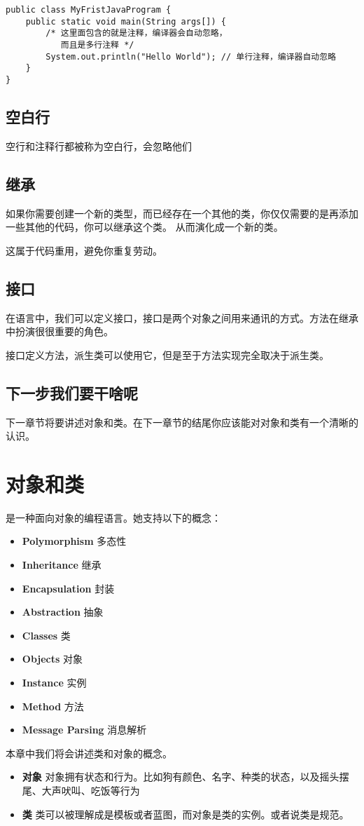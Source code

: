 \documentclass{article}
\begin{document}
\begin{verbatim}
public class MyFristJavaProgram {
	public static void main(String args[]) {
		/* 这里面包含的就是注释，编译器会自动忽略，
		   而且是多行注释 */
		System.out.println("Hello World"); // 单行注释，编译器自动忽略
	}
}
\end{verbatim}

\subsection{空白行}
空行和注释行都被称为空白行，会忽略他们

\subsection{继承}
如果你需要创建一个新的类型，而已经存在一个其他的类，你仅仅需要的是再添加一些其他的代码，你可以继承这个类。
从而演化成一个新的类。

这属于代码重用，避免你重复劳动。

\subsection{接口}
在语言中，我们可以定义接口，接口是两个对象之间用来通讯的方式。方法在继承中扮演很很重要的角色。

接口定义方法，派生类可以使用它，但是至于方法实现完全取决于派生类。

\subsection{下一步我们要干啥呢}
下一章节将要讲述对象和类。在下一章节的结尾你应该能对对象和类有一个清晰的认识。

\section{ 对象和类}
是一种面向对象的编程语言。她支持以下的概念：
\begin{itemize}
\item {\bf Polymorphism} 多态性
\item {\bf Inheritance} 继承
\item {\bf Encapsulation} 封装
\item {\bf Abstraction} 抽象
\item {\bf Classes} 类
\item {\bf Objects} 对象
\item {\bf Instance} 实例
\item {\bf Method} 方法
\item {\bf Message Parsing} 消息解析
\end{itemize}

本章中我们将会讲述类和对象的概念。
\begin{itemize}
\item {\bf 对象} 对象拥有状态和行为。比如狗有颜色、名字、种类的状态，以及摇头摆尾、大声吠叫、吃饭等行为
\item {\bf 类} 类可以被理解成是模板或者蓝图，而对象是类的实例。或者说类是规范。
\end{itemize}
\end{document}

